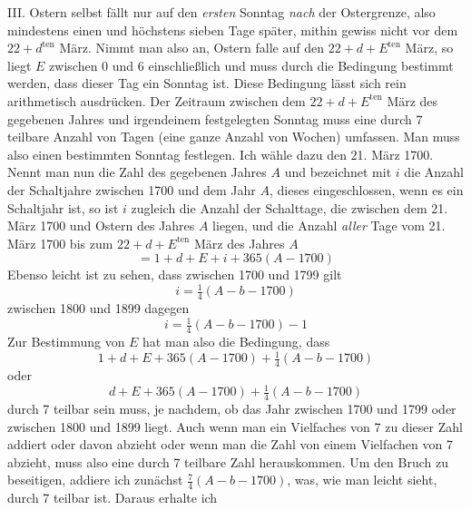 %
III. Ostern selbst fällt nur auf den \textit{ersten} Sonntag \textit{nach} der Ostergrenze, also mindestens einen und höchstens sieben Tage später, mithin gewiss nicht vor dem $22+d^{\mathrm{ten}}$ März. Nimmt man also an, Ostern falle auf den $22+d+E^{\mathrm{ten}}$ März, so liegt $E$ zwischen 0 und 6 einschließlich und muss durch die Bedingung bestimmt werden, dass dieser Tag ein Sonntag ist. Diese Bedingung lässt sich rein arithmetisch ausdrücken. Der Zeitraum zwischen dem $22+d+E^{\mathrm{ten}}$ März des gegebenen Jahres und irgendeinem festgelegten Sonntag muss eine durch 7 teilbare Anzahl von Tagen (eine ganze Anzahl von Wochen) umfassen. Man muss also einen bestimmten Sonntag festlegen. Ich wähle dazu den 21. März 1700. Nennt man nun die Zahl des gegebenen Jahres $A$ und bezeichnet mit $i$ die Anzahl der Schaltjahre zwischen 1700 und dem Jahr $A$, dieses eingeschlossen, wenn es ein Schaltjahr ist, so ist $i$ zugleich die Anzahl der Schalttage, die zwischen dem 21. März 1700 und Ostern des Jahres $A$ liegen, und die Anzahl \textit{aller} Tage vom 21. März 1700 bis zum $22+d+E^{\mathrm{ten}}$ März des Jahres $A$
\[
=1+d+E+i+365(A-1700)
\]
Ebenso leicht ist zu sehen, dass zwischen 1700 und 1799 gilt
\[
i=\tfrac14(A-b-1700)
\]
zwischen 1800 und 1899 dagegen
\[
i=\tfrac14(A-b-1700)-1
\]
Zur Bestimmung von $E$ hat man also die Bedingung, dass
\[
1+d+E+365(A-1700)+\tfrac14(A-b-1700)
\]
oder
\[
d+E+365(A-1700)+\tfrac14(A-b-1700)
\]
durch 7 teilbar sein muss, je nachdem, ob das Jahr zwischen 1700 und 1799 oder zwischen 1800 und 1899 liegt. Auch wenn man ein Vielfaches von 7 zu dieser Zahl addiert oder davon abzieht oder wenn man die Zahl von einem Vielfachen von 7 abzieht, muss also eine durch 7 teilbare Zahl herauskommen. Um den Bruch zu beseitigen, addiere ich zunächst $\frac74(A-b-1700)$, was, wie man leicht sieht, durch 7 teilbar ist. Daraus erhalte ich
